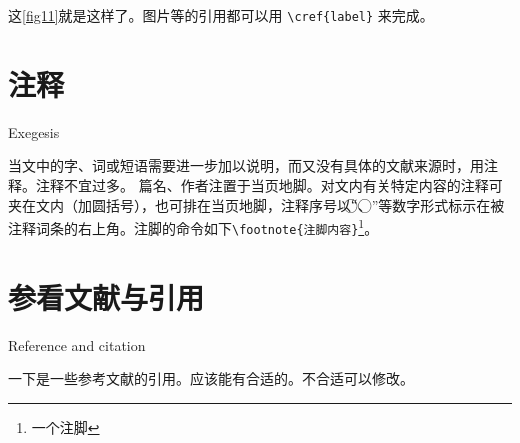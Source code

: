 这\cref{fig11}就是这样了。图片等的引用都可以用 \verb|\cref{label}| 来完成。


\section{注释}{Exegesis}

当文中的字、词或短语需要进一步加以说明，而又没有具体的文献来源时，用注释。注释不宜过多。
篇名、作者注置于当页地脚。对文内有关特定内容的注释可夹在文内（加圆括号），也可排在当页地脚，注释序号以“\textcircled{}、\textcircled{}”等数字形式标示在被注释词条的右上角。注脚的命令如下\verb|\footnote{注脚内容}|\footnote{一个注脚}。%

\section{参看文献与引用}{Reference and citation}

一下是一些参考文献的引用。应该能有合适的。不合适可以修改。


\cite{liuhaiyang2013latex,CTEX}

\cite{XMU}

\citet{liuhaiyang2013latex}

\citep{liuhaiyang2013latex}

\citealt{liuhaiyang2013latex}

\citeauthor{liuhaiyang2013latex}

\citeyearpar{liuhaiyang2013latex}
